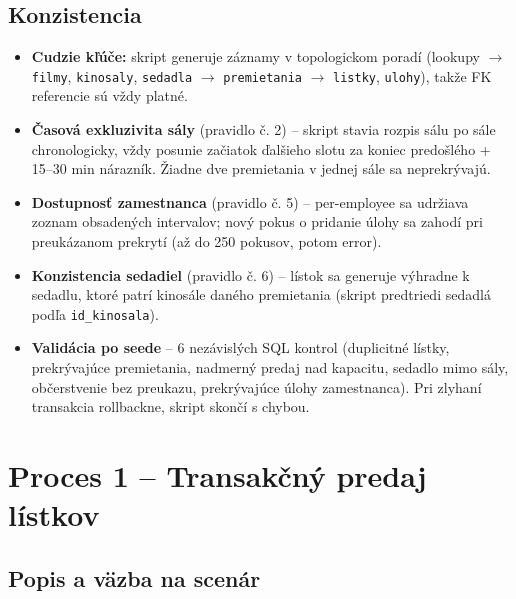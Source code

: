 \documentclass[11pt, a4paper]{article}
\begin{document}
\subsection{Konzistencia}

\begin{itemize}
    \item \textbf{Cudzie kľúče:} skript generuje záznamy v topologickom
    poradí (lookupy $\rightarrow$ \texttt{filmy}, \texttt{kinosaly},
    \texttt{sedadla} $\rightarrow$ \texttt{premietania}
    $\rightarrow$ \texttt{listky}, \texttt{ulohy}), takže FK referencie sú
    vždy platné.

    \item \textbf{Časová exkluzivita sály} (pravidlo č. 2) -- skript stavia
    rozpis sálu po sále chronologicky, vždy posunie začiatok ďalšieho slotu
    za koniec predošlého + 15--30 min nárazník. Žiadne dve premietania
    v jednej sále sa neprekrývajú.

    \item \textbf{Dostupnosť zamestnanca} (pravidlo č. 5) -- per-employee
    sa udržiava zoznam obsadených intervalov; nový pokus o pridanie úlohy
    sa zahodí pri preukázanom prekrytí (až do 250 pokusov, potom error).

    \item \textbf{Konzistencia sedadiel} (pravidlo č. 6) -- lístok sa
    generuje výhradne k sedadlu, ktoré patrí kinosále daného premietania
    (skript predtriedi sedadlá podľa \texttt{id\_kinosala}).

    \item \textbf{Validácia po seede} -- 6 nezávislých SQL kontrol
    (duplicitné lístky, prekrývajúce premietania, nadmerný predaj nad
    kapacitu, sedadlo mimo sály, občerstvenie bez preukazu, prekrývajúce
    úlohy zamestnanca). Pri zlyhaní transakcia rollbackne, skript skončí
    s chybou.
\end{itemize}

\newpage
\section{Proces 1 -- Transakčný predaj lístkov}
\label{sec:proces1}

\subsection{Popis a väzba na scenár}
\end{document}
